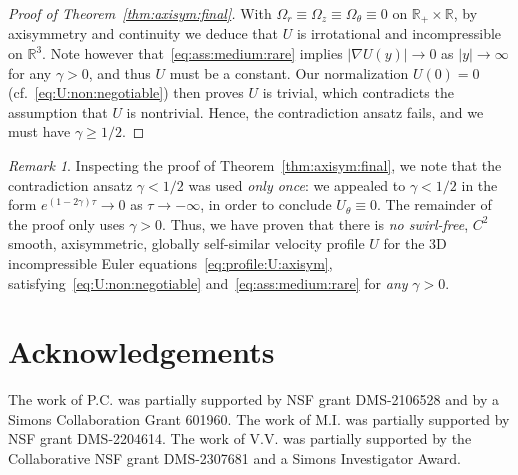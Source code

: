\documentclass[11pt,reqno]{amsproc}
\numberwithin{equation}{section}
\theoremstyle{remark}
\newtheorem{remark}[theorem]{Remark}
\begin{document}
\begin{proof}[Proof of Theorem~\ref{thm:axisym:final}]
With $\Omega_r\equiv\Omega_z\equiv\Omega_\theta \equiv 0$  on $\mathbb{R}_+ \times \mathbb{R}$, by axisymmetry and continuity we deduce that $U$ is irrotational and incompressible on $\mathbb{R}^3$. Note however that~\eqref{eq:ass:medium:rare} implies $|\nabla U(y)| \to 0$ as $|y|\to \infty$ for any $\gamma>0$, and thus $U$ must be a constant. Our normalization $U(0)=0$ (cf.~\eqref{eq:U:non:negotiable}) then proves $U$ is trivial, which contradicts the assumption that $U$ is nontrivial. Hence, the contradiction ansatz fails, and we must have $\gamma \geq 1/2$.
\end{proof}

\begin{remark}
Inspecting the proof of Theorem~\ref{thm:axisym:final}, we note that the contradiction ansatz $\gamma < 1/2$ was used \emph{only once}: we appealed to $\gamma < 1/2$ in the form $e^{(1-2\gamma)\tau} \to 0$ as $\tau\to -\infty$, in order to conclude $U_\theta \equiv 0$. The remainder of the proof only uses $\gamma>0$. Thus, we have proven that there is \emph{no swirl-free},  $C^2$ smooth, axisymmetric, globally self-similar velocity profile $U$ for the 3D incompressible Euler equations~\eqref{eq:profile:U:axisym}, satisfying~\eqref{eq:U:non:negotiable} and~\eqref{eq:ass:medium:rare} for \emph{any} $\gamma>0$. 
\end{remark}

\section*{Acknowledgements}  
The work of P.C. was partially supported by NSF grant DMS-2106528 and by a Simons Collaboration
Grant 601960. The work of M.I. was partially supported by NSF grant DMS-2204614. The work of V.V. was partially supported by the Collaborative NSF grant DMS-2307681
and a Simons Investigator Award.  
  
\end{document}
